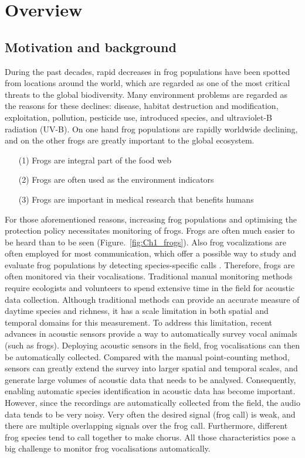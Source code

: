 
\chapter[Overview]{Overview}
\label{cha:cha1Introduction}

\section{Motivation and background}
During the past decades, rapid decreases in frog populations have been spotted from locations around the world, which are regarded as one of the most critical threats to the global biodiversity. Many environment problems are regarded as the reasons for these declines: disease, habitat destruction and modification, exploitation, pollution, pesticide use, introduced species, and ultraviolet-B radiation (UV-B). 
On one hand frog populations are rapidly worldwide declining, and on the other frogs are greatly important to the global ecosystem. 
\begin{enumerate}
\item[(1)] Frogs are integral part of the food web
\item[(2)] Frogs are often used as the environment indicators 
\item[(3)] Frogs are important in medical research that benefits humans 
\end{enumerate}

For those aforementioned reasons, increasing frog populations and optimising the protection policy necessitates monitoring of frogs. Frogs are often much easier to be heard than to be seen (Figure.~\ref{fig:Ch1_frogs}). Also frog vocalizations are often employed for most communication, which offer a possible way to study and evaluate frog populations by detecting species-specific calls \citep{dorcas2009auditory}. Therefore, frogs are often monitored via their vocalisations. Traditional manual monitoring methods require ecologists and volunteers to spend extensive time in the field for  acoustic data collection. Although traditional methods can provide an accurate measure of daytime species and richness, it has a scale limitation in both spatial and temporal domains for this measurement.
To address this limitation, recent advances in acoustic sensors provide a way to automatically survey vocal animals (such as frogs). Deploying acoustic sensors in the field, frog vocalisations can then be automatically collected. Compared with the manual point-counting method, sensors can greatly extend the survey into larger spatial and temporal scales, and generate large volumes of acoustic data that needs to be analysed. Consequently, enabling automatic species identification in acoustic data has become important. However, since the recordings are automatically collected from the field, the audio data tends to be very noisy. Very often the desired signal (frog call) is weak, and there are multiple overlapping signals over the frog call. Furthermore, different frog species tend to call together to make chorus. All those characteristics pose a big challenge to monitor frog vocalisations automatically.

